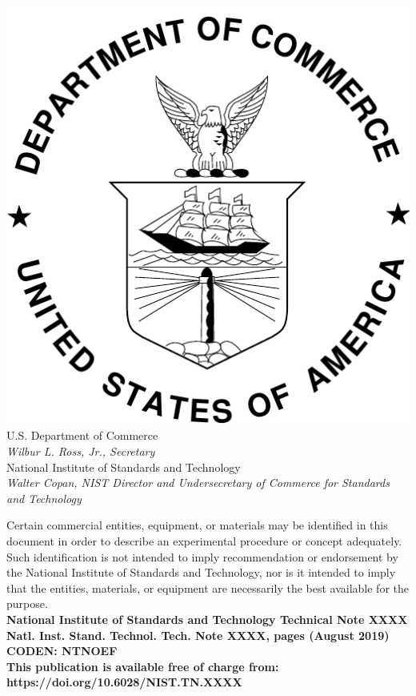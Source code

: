 \documentclass[12pt]{article}
\newcommand{\pubnumber}{XXXX}
\newcommand{\DOI}{https://doi.org/10.6028/NIST.TN.XXXX}
\newcommand{\monthyear}{August 2019}
\begin{document}
\begin{titlepage}
\begin{flushright}
\includegraphics[width=0.18\linewidth]{DoC-logo}\\
\vfill
\footnotesize U.S. Department of Commerce\\
\textit{Wilbur L. Ross, Jr., Secretary}\\
\vspace{10pt}
National Institute of Standards and Technology\\
\textit{Walter Copan, NIST Director and Undersecretary of Commerce for Standards and Technology}
\end{flushright}
\end{titlepage}

\begin{titlepage}
\begin{flushright}
\footnotesize  Certain commercial entities, equipment, or materials may be identified in this document in order to describe an experimental procedure or concept adequately. Such identification is not intended to imply recommendation or endorsement by the National Institute of Standards and Technology, nor is it intended to imply that the entities, materials, or equipment are necessarily the best available for the purpose.\\
\vfill
\normalsize \textbf{National Institute of Standards and Technology Technical Note \pubnumber\\
Natl. Inst. Stand. Technol. Tech. Note \pubnumber, \pageref{LastPage} pages (\monthyear)} \\
\textbf{CODEN: NTNOEF}\\
\vspace{12pt}
\textbf{This publication is available free of charge from: \DOI}
\vfill
\end{flushright}
\end{titlepage}
\end{document}
